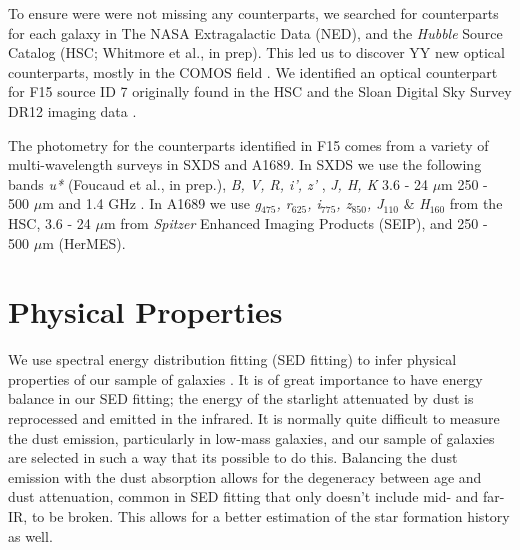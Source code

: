 \documentclass[preprint,natbib209]{aastex}
\begin{document}
To ensure were were not missing any counterparts, we searched for counterparts for each galaxy in The NASA Extragalactic Data (NED), and
the \textit{Hubble} Source Catalog (HSC; Whitmore et al., in prep). This led us to discover YY new optical counterparts, 
mostly in the COMOS field \citep{COSMOS}. %
We identified an optical counterpart for F15 source ID 7 originally found in the HSC and the Sloan Digital Sky Survey \citep[SDSS;][]{york2000} 
DR12 \citep{alam15} imaging data \citep{fukugita96, gunn98, hogg01, smith02, pier03, ivezic04, gunn06, tucker06, padmanabhan08, doi10}.

The photometry for the counterparts identified in F15 comes from a variety of multi-wavelength surveys in SXDS and A1689.
In SXDS we use the following bands \textit{u*} (Foucaud et al., in prep.), \textit{B, V, R, i', z'} \citep{furusawa08},
\textit{J, H, K} \citep[UKIDSS;\footnotemark][]{lawrence07} 3.6 - 24 $\mu$m \citep[SWIRE, SpUDS, SEDS;][]{lonsdale03, ashby13}
250 - 500 $\mu$m \citep[HerMES;][]{oliver12, smith12, wang14} and 1.4 GHz \citep{simpson06}.
In A1689 we use \textit{g$_{475}$, r$_{625}$, i$_{775}$, z$_{850}$, J$_{110}$} \& \textit{H}$_{160}$ from the HSC,
 3.6 - 24 $\mu$m from \textit{Spitzer} Enhanced Imaging Products (SEIP), and 250 - 500 $\mu$m (HerMES).


\section{Physical Properties}
\label{sec:analysis}

We use spectral energy distribution fitting (SED fitting) to infer physical properties of our sample of galaxies \citep[for a recent review of SED fitting see][]{conroy13}. It is of great importance to have energy balance in our SED fitting; the energy of the starlight attenuated by dust is reprocessed and emitted in the infrared. It is normally quite difficult to measure the dust emission, particularly in low-mass galaxies, and our sample of galaxies are selected in such a way that its possible to do this. Balancing the dust emission with the dust absorption allows for the degeneracy between age and dust attenuation, common in SED fitting that only doesn't include mid- and far-IR, to be broken. This allows for a better estimation of the star formation history as well.
\end{document}
